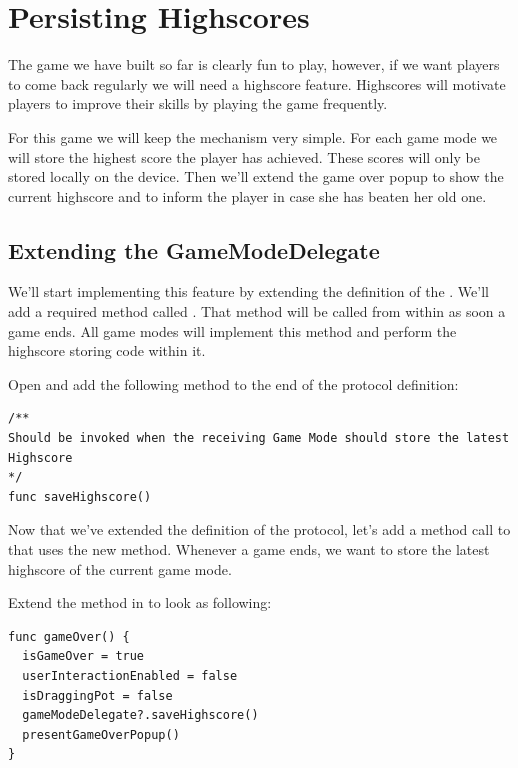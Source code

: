 \chapter{Persisting Highscores}
The game we have built so far is clearly fun to play, however, if we want
players to come back regularly we will need a highscore feature. Highscores will
motivate players to improve their skills by playing the game frequently.

For this game we will keep the mechanism very simple. For each game mode we will
store the highest score the player has achieved. These scores will only be
stored locally on the device. Then we'll extend the game over popup to show the
current highscore and to inform the player in case she has beaten her old one.

\section{Extending the GameModeDelegate}
We'll start implementing this feature by extending the definition of the
. We'll add a required method called
. That method will be called from within
 as soon a game ends. All game modes will implement this
method and perform the highscore storing code within it.

\begin{leftbar}
Open  and add the following method to the
end of the protocol definition:
\begin{lstlisting}
/**
Should be invoked when the receiving Game Mode should store the latest Highscore
*/
func saveHighscore()
\end{lstlisting}
\end{leftbar}

Now that we've extended the definition of the protocol, let's add a method call
to  that uses the new  method.
Whenever a game ends, we want to store the latest highscore of the current game
mode.

\begin{leftbar}
Extend the  method in  to look
as following:
\begin{lstlisting}
func gameOver() {
  isGameOver = true
  userInteractionEnabled = false
  isDraggingPot = false
  gameModeDelegate?.saveHighscore()
  presentGameOverPopup()
}
\end{lstlisting}
\end{leftbar}

